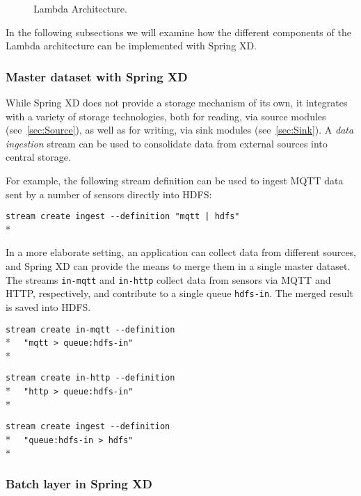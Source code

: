 \begin{figure}[ht]
\centering
{}
\caption{Lambda Architecture.}
\label{fig:lambda}
\end{figure}

In the following subsections we will examine how the different components
of the Lambda architecture can be implemented with Spring XD.

\subsubsection {Master dataset with Spring XD}

While Spring XD does not provide a storage mechanism of its own, it
integrates with a variety of storage technologies, both for reading,
via source modules (see~\ref{sec:Source}), as well as for writing, via
sink modules (see~\ref{sec:Sink}). A \emph{data ingestion}
stream can be used to consolidate data from external sources into
central storage.

For example, the following stream definition can be used to ingest 
MQTT data sent by a number of sensors directly into HDFS:

\verb;stream create ingest --definition "mqtt | hdfs";\\*

In a more elaborate setting, an application can collect data from
different sources, and Spring XD can provide the means to merge them
in a single master dataset. The streams \texttt{in-mqtt} and \texttt{in-http}
collect data from sensors via MQTT and HTTP, respectively, and
contribute to a single queue \texttt{hdfs-in}. The merged result
is saved into HDFS.

\verb;stream create in-mqtt --definition ;\\*
\verb;  "mqtt > queue:hdfs-in";\\*

\verb;stream create in-http --definition  ;\\*
\verb;  "http > queue:hdfs-in";\\*

\verb;stream create ingest --definition  ;\\*
\verb;  "queue:hdfs-in > hdfs";\\*

\subsubsection {Batch layer in Spring XD}

